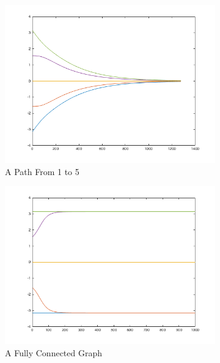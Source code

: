 \documentclass{article}
\begin{document}
\begin{figure}[h!]
\caption{Initial Values Between ($-\pi$ to $\pi$)}
\centering
\begin{subfigure}[t]{0.3\textwidth}
\centering
\includegraphics[width=\textwidth]{./p3minimally_connected.png}
\caption{A Path From 1 to 5}
\end{subfigure}
\begin{subfigure}[t]{0.3\textwidth}
\centering
\includegraphics[width=\textwidth]{p3_maximally_connected.png}
\caption{A Fully Connected Graph}
\end{subfigure}
\begin{subfigure}[t]{0.3\textwidth}
\centering

\end{subfigure}
\end{figure}
\end{document}
